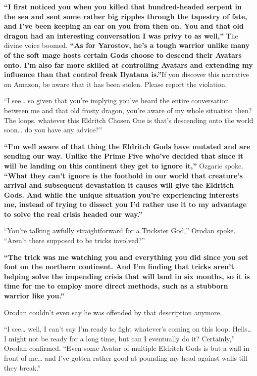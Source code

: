 \documentclass[a4paper,10pt]{book}
\begin{document}
\textbf{“I first noticed you when you killed that hundred-headed serpent in the sea and sent some rather big ripples through the tapestry of fate, and I’ve been keeping an ear on you from then on. You and that old dragon had an interesting conversation I was privy to as well,” }The divine voice boomed. \textbf{“As for Yarostov, he’s a tough warrior unlike many of the soft mage hosts certain Gods choose to descend their Avatars onto. I’m also far more skilled at controlling Avatars and extending my influence than that control freak Ilyatana is.”}If you discover this narrative on Amazon, be aware that it has been stolen. Please report the violation.\par
“I see… so given that you’re implying you’ve heard the entire conversation between me and that old frosty dragon, you’re aware of my whole situation then? The loops, whatever this Eldritch Chosen One is that’s descending onto the world soon… do you have any advice?”\par
\textbf{“I’m well aware of that thing the Eldritch Gods have mutated and are sending our way. Unlike the Prime Five who’ve decided that since it will be landing on this continent they get to ignore it,” }Ozgaric spoke. \textbf{“What they can’t ignore is the foothold in our world that creature’s arrival and subsequent devastation it causes will give the Eldritch Gods. And while the unique situation you’re experiencing interests me, instead of trying to dissect you I’d rather use it to my advantage to solve the real crisis headed our way.”}\par
“You’re talking awfully straightforward for a Trickster God,” Orodan spoke. “Aren’t there supposed to be tricks involved?”\par
\textbf{“The trick was me watching you and everything you did since you set foot on the northern continent. And I’m finding that tricks aren’t helping solve the impending crisis that will land in six months, so it is time for me to employ more direct methods, such as a stubborn warrior like you.”}\par
Orodan couldn’t even say he was offended by that description anymore.\par
“I see… well, I can’t say I’m ready to fight whatever’s coming on this loop. Hells… I might not be ready for a long time, but can I eventually do it? Certainly,” Orodan confirmed. “Even some Avatar of multiple Eldritch Gods is but a wall in front of me… and I’ve gotten rather good at pounding my head against walls till they break.”\par
\end{document}
